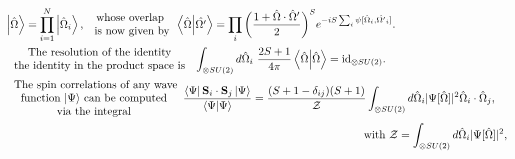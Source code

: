\documentclass{homework}
\begin{document}
\begin{equation}
\begin{split}
    &\ket{\hat{\Omega}} = \prod_{i=1}^N \ket{\hat{\Omega}_i}, \begin{array}{c}
         \textnormal{ whose overlap }  \\
         \textnormal{ is now given by}
    \end{array} \bra{\hat{\Omega}}\ket{\hat{\Omega'}} = \prod_{i} \bigg(\frac{1 + \hat{\Omega} \cdot \hat{\Omega}'}{2} \bigg)^S e^{-iS \sum_{i} \psi[\hat{\Omega}_i, \hat{\Omega'}_i]}. \\
    & \begin{array}{c}
         \textnormal{ The resolution of the identity }  \\
         \textnormal{ the identity in the product space is } 
    \end{array} \int_{\otimes SU(2)} d\hat{\Omega}_i \blanky \frac{2S+1}{4\pi} \bra{\hat{\Omega}} \ket{\hat{\Omega}} = \textnormal{id}_{\otimes SU(2)}. \\
    & \begin{array}{c}
         \textnormal{ The spin correlations of any wave}  \\
         \textnormal{ function $\ket{\Psi}$ can be computed } \\
         \textnormal{ via the integral }
    \end{array} \frac{\bra{\Psi} \spin_i \cdot \spin_j \ket{\Psi}}{\bra{\Psi} \ket{\Psi}} = \frac{(S+1 - \delta_{ij})(S+1)}{\mathcal{Z}} \int_{\otimes SU(2)} d\hat{\Omega}_i |\Psi[\hat{\Omega}]|^2 \hat{\Omega}_i \cdot \hat{\Omega}_j, \\
    & \blanky\blanky\blanky\blanky\blanky\blanky\blanky\blanky\blanky\blanky\blanky\blanky\blanky\blanky\blanky\blanky\blanky\blanky\blanky\blanky\blanky\blanky\blanky\blanky\blanky\blanky\blanky\blanky\blanky\blanky\blanky\blanky \blanky\blanky\blanky\blanky\blanky\blanky\blanky\blanky\blanky\blanky\blanky\blanky\blanky\blanky\blanky\blanky\blanky\blanky\blanky\blanky\blanky\blanky\blanky\blanky\blanky\blanky\blanky\blanky\blanky\blanky\blanky\blanky \blanky\blanky\blanky\blanky\blanky\blanky\blanky\blanky\blanky\blanky\blanky\blanky\blanky\blanky\blanky\blanky\blanky\blanky\blanky\blanky\blanky\blanky\blanky\blanky\blanky\blanky\blanky\blanky\blanky\blanky\blanky\blanky \textnormal{ with } \mathcal{Z} = \int_{\otimes SU(2)} d\hat{\Omega}_i |\Psi[\hat{\Omega}]|^2,
    \label{multi_coherent_states_identities}
\end{split}
\end{equation}
\end{document}
